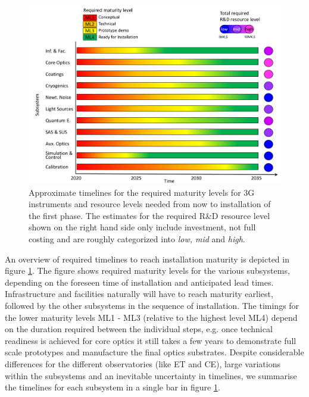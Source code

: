 \section*{}
\begin{figure}[h]
\centering
\includegraphics*[width= \textwidth]{Figures/3G_Readiness_Levelsblue.pdf}
\caption{Approximate timelines for the required maturity levels for 3G instruments and resource levels needed from now to installation of the first phase. The estimates for the required R\&D resource level shown on the right hand side only include investment, not full costing and are roughly categorized into \textit{low, mid} and \textit{high}.\\
}
\label{fig:maturity}
\end{figure}

An overview of required timelines to reach installation maturity is depicted in figure \ref{fig:maturity}. The figure shows required maturity levels for the various subsystems, depending on the foreseen time of installation and anticipated lead times. Infrastructure and facilities naturally will have to reach maturity earliest, followed by the other subsystems in the sequence of installation. The timings for the lower maturity levels ML1 - ML3 (relative to the highest level ML4) depend on the duration required between the individual steps, e.g. once technical readiness is achieved for core optics it still takes a few years to demonstrate full scale prototypes and manufacture the final optics substrates. Despite considerable differences for the different observatories (like ET and CE), large variations within the subsystems and an inevitable uncertainty in timelines, we summarise the timelines  for each subsystem in a single bar in figure \ref{fig:maturity}.  

